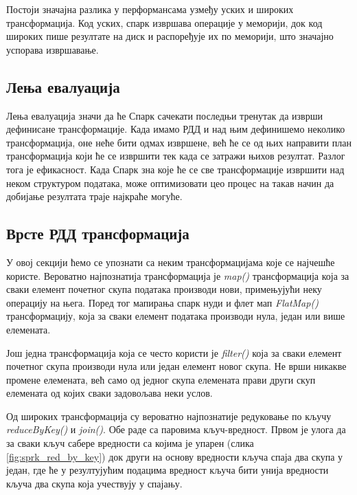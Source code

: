 \documentclass[12pt,oneside]{memoir}
\begin{document}
Постоји значајна разлика у перформансама узмеђу уских и широких трансформација. Код уских, спарк извршава операције у меморији, док код широких пише резултате на диск и распоређује их по меморији, што значајно успорава извршавање. \cite{spark_guide}

\subsection{Лења евалуација}
\label{subsec:spark_lazy_eval}

Лења евалуација значи да ће Спарк сачекати последњи тренутак да изврши дефинисане трансформације. Када имамо РДД и над њим дефинишемо неколико трансформација, оне неће бити одмах извршене, већ ће се од њих направити план трансформација који ће се извршити тек када се затражи њихов резултат. Разлог тога је ефикасност. Када Спарк зна које ће се све трансформације извршити над неком структуром података, може оптимизовати цео процес на такав начин да добијање резултата траје најкраће могуће. \cite{spark_guide}

\subsection{Врсте РДД трансформација}
\label{subsec:spark_transformation_types}

У овој секцији ћемо се упознати са неким трансформацијама које се најчешће користе. Вероватно најпознатија трансформација је \textit{map()} трансформација која за сваки елемент почетног скупа података производи нови, примењујући неку операцију на њега. Поред тог мапирања спарк нуди и флет мап \textit{FlatMap()} трансформацију, која за сваки елемент података производи нула, један или више елемената.

Још једна трансформација која се често користи је \textit{filter()} која за сваки елемент почетног скупа производи нула или један елемент новог скупа. Не врши никакве промене елемената, већ само од једног скупа елемената прави други скуп елемената од којих сваки задовољава неки услов.

Од широких трансформација су вероватно најпознатије редуковање по кључу \textit{reduceByKey()} и \textit{join()}. Обе раде са паровима кључ-вредност. Првом је улога да за сваки кључ сабере вредности са којима је упарен (слика \ref{fig:sprk_red_by_key}) док други на основу вредности кључа спаја два скупа у један, где ће у резултујућим подацима вредност кључа бити унија вредности кључа два скупа која учествују у спајању.
\end{document}
